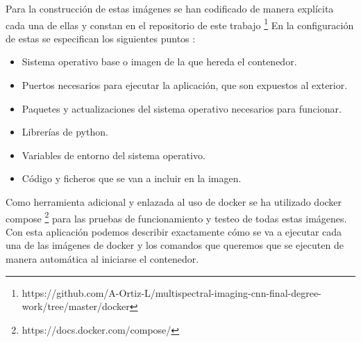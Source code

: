 Para la construcción de estas imágenes se han codificado de manera explícita cada una de ellas y constan en el repositorio de este trabajo \footnote{https://github.com/A-Ortiz-L/multispectral-imaging-cnn-final-degree-work/tree/master/docker}
En la configuración de estas se especifican los siguientes puntos :
\begin{itemize}
    \item Sistema operativo base o imagen de la que hereda el contenedor.
    \item Puertos necesarios para ejecutar la aplicación, que son expuestos al exterior.
    \item Paquetes y actualizaciones del sistema operativo necesarios para funcionar.
    \item Librerías de python.
    \item Variables de entorno del sistema operativo.
    \item Código y ficheros que se van a incluir en la imagen.
\end{itemize}

Como herramienta adicional y enlazada al uso de docker se ha utilizado docker compose \footnote{https://docs.docker.com/compose/} para las pruebas de funcionamiento y testeo de todas estas imágenes.
Con esta aplicación podemos describir exactamente cómo se va a ejecutar cada una de las imágenes de docker y los comandos que queremos que se ejecuten de manera automática al iniciarse el contenedor.

